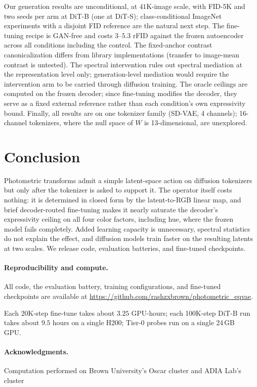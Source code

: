 \documentclass[11pt]{article}
\begin{document}
Our generation results are unconditional, at $41$K-image scale, with FID-5K
and two seeds per arm at DiT-B (one at DiT-S); class-conditional ImageNet
experiments with a disjoint FID reference are the natural next step. The fine-tuning recipe is GAN-free and
costs $3$--$5.3$ rFID against the frozen autoencoder across all conditions
including the control. The fixed-anchor contrast canonicalization differs from
library implementations (transfer to image-mean contrast is untested). The
spectral intervention rules out spectral mediation at the representation
level only; generation-level mediation would require the intervention arm to
be carried through diffusion training. The oracle ceilings are computed on
the frozen decoder; since fine-tuning modifies the decoder, they serve as a
fixed external reference rather than each condition's own expressivity bound. Finally, all results are on one
tokenizer family (SD-VAE, 4 channels); 16-channel tokenizers, where the null
space of $W$ is 13-dimensional, are unexplored.

\section{Conclusion}
\label{sec:conclusion}

Photometric transforms admit a simple latent-space action on diffusion
tokenizers but only after the tokenizer is asked to support it. The
operator itself costs nothing: it is determined in closed form by the latent-to-RGB
linear map, and brief decoder-routed fine-tuning makes it nearly saturate the
decoder's expressivity ceiling on all four color factors, including hue, where
the frozen model fails completely. Added learning capacity is unnecessary,
spectral statistics do not explain the effect, and diffusion models train
faster on the resulting latents at two scales. We release code, evaluation
batteries, and fine-tuned checkpoints.

\paragraph{Reproducibility and compute.}
All code, the evaluation battery, training configurations, and fine-tuned
checkpoints are available at \url{https://github.com/rashzxbrown/photometric_eqvae}.

Each 20K-step fine-tune takes about $3.25$ GPU-hours; each 100K-step DiT-B
run takes about $9.5$ hours on a single H200; Tier-0 probes run on a single
24\,GB GPU.

\paragraph{Acknowledgments.} Computation performed on Brown University's
Oscar cluster and ADIA Lab's cluster
\end{document}
